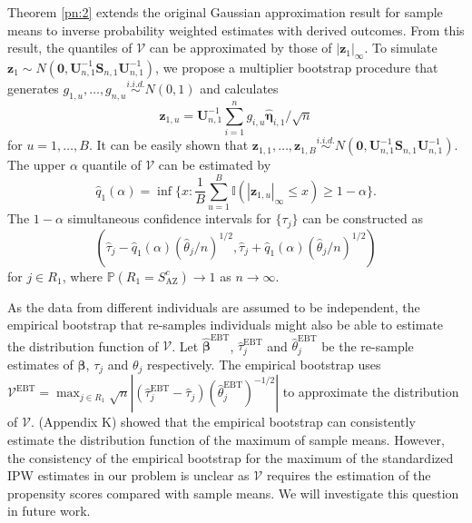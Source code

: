 \documentclass[12pt]{article}
\def\be{\begin{equation}}
\def\ee{\end{equation}}
\def\EBT{{ \mathrm{\scriptscriptstyle EBT} }}
\def\AZ{{ \mathrm{\scriptscriptstyle AZ} }}
\theoremstyle{definition}
\newcommand{\bS}{{\mathbf S}}
\newcommand{\bU}{{\mathbf U}}
\newcommand{\bz}{{\mathbf z}}
\newcommand{\bbeta}  {\boldsymbol{\beta}}
\newcommand{\bfeta}  {\boldsymbol{\eta}}
\newcommand{\bzero}{{\mathbf 0}}
\newcommand{\btau}{\boldsymbol{\tau}}
\begin{document}
Theorem \ref{pn:2} extends the original Gaussian approximation result for sample means \citep{chernozhukov2013gaussian} to 
inverse probability weighted estimates with derived outcomes. 
From this result, the quantiles of $\mathcal{V}$ can be approximated by those of $|\bz_1|_{\infty}$.
To simulate $\bz_1 \sim N(\bzero, \bU_{n, 1}^{-1} \bS_{n, 1} \bU_{n, 1}^{-1})$, we propose a multiplier bootstrap procedure that generates $g_{1, u}, \ldots, g_{n, u} \overset{i.i.d.}{\sim} N(0, 1)$ and calculates $$\bz_{1, u} = \bU_{n, 1}^{-1} \sum_{i=1}^{n} g_{i, u} \hat{\bfeta}_{i, 1} / \sqrt{n}$$ for $u = 1, \ldots, B$. It can be easily shown that $\bz_{1, 1}, \ldots, \bz_{1, B} \overset{i.i.d.}{\sim} N(\bzero, \bU_{n, 1}^{-1} \bS_{n, 1} \bU_{n, 1}^{-1})$. 
The upper $\alpha$ quantile of $\mathcal{V}$ can be estimated by
\begin{equation}\label{eq:hatq1}
\hat{q}_{1}(\alpha) = \inf\bigg\{x: \frac{1}{B}\sum_{u=1}^{B} \mathbb{I}(|{\bz}_{1, u}|_\infty\leq x) \geq  1-\alpha\bigg\}.
\end{equation}
The $1 - \alpha$ simultaneous confidence intervals for $\{\tau_j\}$ can be constructed as 
\be\label{eq:CI-S}
(\hat{\tau}_j - \hat{q}_{1}(\alpha) (\hat{\theta}_j / n)^{1/2} , \hat{\tau}_j + \hat{q}_{1}(\alpha) (\hat{\theta}_j / n)^{1/2})
\ee
for $j \in R_{1}$,
where $\mathbb{P}(R_1 = S_{\AZ}^c) \to 1$ as $n \to \infty$.

As the data from different individuals are assumed to be independent, the empirical bootstrap that re-samples individuals might also be able to estimate the distribution function of $\mathcal{V}$.
Let $\hat{\bbeta}^{\EBT}$, $\hat{\tau}_j^{\EBT}$ and $\hat{\theta}_j^{\EBT}$ be the re-sample estimates of $\bbeta$, $\tau_j$ and $\theta_j$ respectively.
The empirical bootstrap uses $\mathcal{V}^{\EBT} = \max_{j \in R_1} \sqrt{n}| (\hat{\tau}_{j}^{\EBT} - \hat{\tau}_j) (\hat{\theta}_{j}^{\EBT})^{-1/2} |$ to approximate the distribution of $\mathcal{V}$.
\cite{chernozhukov2013gaussian} (Appendix K) showed that the empirical bootstrap can consistently estimate the distribution function of the maximum of sample means. However, the consistency of the empirical bootstrap for the maximum of the standardized IPW estimates in our problem is unclear
as $\mathcal{V}$ requires the estimation of the propensity scores compared with sample means. 
We will investigate this question in future work.
\end{document}
